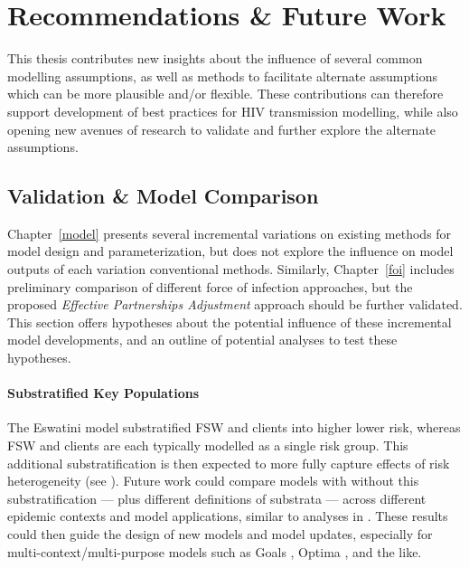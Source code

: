 \section{Recommendations \& Future Work}\label{conc.future}
This thesis contributes new insights about the influence of several common modelling assumptions,
as well as methods to facilitate alternate assumptions which can be more plausible and/or flexible.
These contributions can therefore support development of
best practices for HIV transmission modelling, while also
opening new avenues of research to validate and further explore the alternate assumptions.
\subsection{Validation \& Model Comparison}\label{conc.future.val}
Chapter~\ref{model} presents several
incremental variations on existing methods for model design and parameterization,
but does not explore the influence on model outputs of each variation \vs conventional methods.
Similarly, Chapter~\ref{foi} includes
preliminary comparison of different force of infection approaches,
but the proposed \emph{Effective Partnerships Adjustment} approach should be further validated.
This section offers hypotheses about
the potential influence of these incremental model developments,
and an outline of potential analyses to test these hypotheses.
\paragraph{Substratified Key Populations}
The Eswatini model substratified FSW and clients into higher \vs lower risk,
whereas FSW and clients are each typically modelled as a single risk group.
This additional substratification is then expected to
more fully capture effects of risk heterogeneity (see ).
Future work could compare models with \vs without this substratification
--- plus different definitions of substrata ---
across different epidemic contexts and model applications,
similar to analyses in \cite{Hontelez2013,Bernard2017,Suen2017}.
These results could then guide the design of new models and model updates,
especially for multi-context/multi-purpose models such as
Goals \cite{Stover2014}, Optima \cite{Kerr2015}, and the like.
